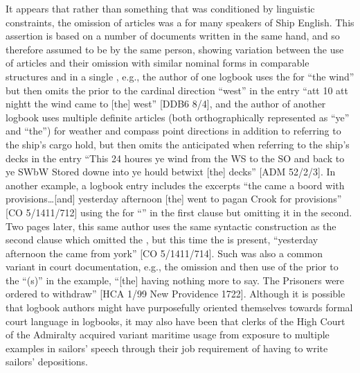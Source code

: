 It appears that rather than something that was conditioned by linguistic constraints, the omission of articles was a  for many speakers of Ship English. This assertion is based on a number of documents written in the same hand, and so therefore assumed to be by the same person, showing variation between the use of articles and their omission with similar nominal forms in comparable structures and in a single , e.g., the author of one logbook uses the  for “the wind” but then omits the  prior to the cardinal direction “west” in the entry “att 10 att nightt the wind came to [the] west” [DDB6 8/4], and the author of another logbook uses multiple definite articles (both orthographically represented as “ye” and “the”) for weather and compass point directions in addition to referring to the ship’s cargo hold, but then omits the anticipated  when referring to the ship’s decks in the entry “This 24 houres ye wind from the WS to the SO and back to ye SWbW Stored downe into ye hould betwixt [the] decks” [ADM 52/2/3]. In another example, a logbook entry includes the excerpts “the  came a boord with provisions…[and] yesterday afternoon [the]  went to pagan Crook for provisions” [CO 5/1411/712] using the  for “” in the first clause but omitting it in the second. Two pages later, this same author uses the same syntactic construction as the second clause which omitted the , but this time the  is present, “yesterday afternoon the  came from york” [CO 5/1411/714]. Such  was also a common variant in court documentation, e.g., the omission and then use of the  prior to the  “(s)” in the example, “[the]  having nothing more to say. The Prisoners were ordered to withdraw” [HCA 1/99 New Providence 1722]. Although it is possible that logbook authors might have purposefully oriented themselves towards formal court language in logbooks, it may also have been that clerks of the High Court of the Admiralty acquired variant maritime usage from exposure to multiple examples in sailors’ speech through their job requirement of having to write sailors’ depositions. 

